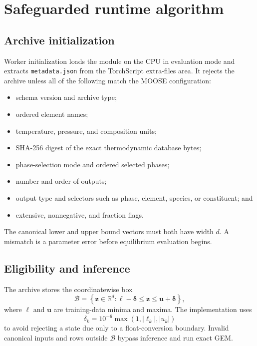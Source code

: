 \documentclass[11pt]{article}
\newcommand{\R}{\mathbb{R}}
\newcommand{\abs}[1]{\left\lvert #1\right\rvert}
\newcommand{\code}[1]{\texttt{#1}}
\begin{document}
\section{Safeguarded runtime algorithm}

\subsection{Archive initialization}

Worker initialization loads the module on the CPU in evaluation mode and extracts
\code{metadata.json} from the TorchScript extra-files area.  It rejects the archive unless all of
the following match the MOOSE configuration:
\begin{itemize}[leftmargin=*]
  \item schema version and archive type;
  \item ordered element names;
  \item temperature, pressure, and composition units;
  \item SHA-256 digest of the exact thermodynamic database bytes;
  \item phase-selection mode and ordered selected phases;
  \item number and order of outputs;
  \item output type and selectors such as phase, element, species, or constituent; and
  \item extensive, nonnegative, and fraction flags.
\end{itemize}
The canonical lower and upper bound vectors must both have width \(d\).  A mismatch is a parameter
error before equilibrium evaluation begins.

\subsection{Eligibility and inference}

The archive stores the coordinatewise box
\begin{equation}
  \mathcal{B}
  =\left\{
    \boldsymbol{z}\in\R^d:
    \boldsymbol{\ell}-\boldsymbol{\delta}
    \leq\boldsymbol{z}
    \leq\boldsymbol{u}+\boldsymbol{\delta}
  \right\},
  \label{eq:box}
\end{equation}
where \(\boldsymbol{\ell}\) and \(\boldsymbol{u}\) are training-data minima and maxima.  The
implementation uses
\begin{equation}
  \delta_k
  =10^{-6}\max\left(1,\abs{\ell_k},\abs{u_k}\right)
  \label{eq:bound-padding}
\end{equation}
to avoid rejecting a state due only to a float-conversion boundary.  Invalid canonical inputs and
rows outside \(\mathcal{B}\) bypass inference and run exact GEM.
\end{document}
